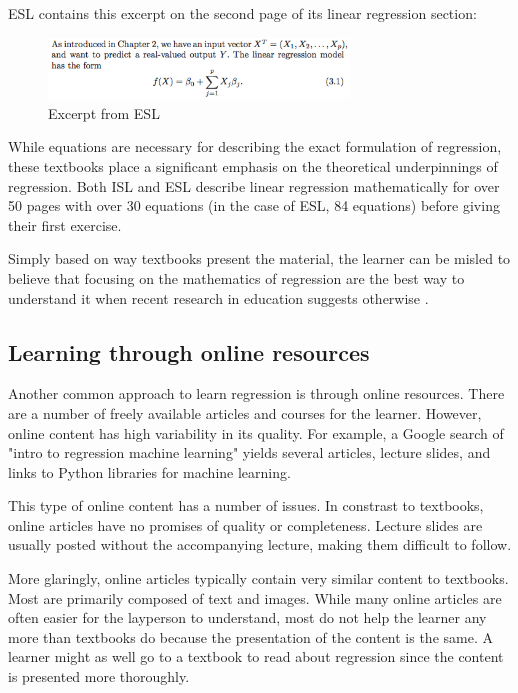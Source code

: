 \documentclass{acm_proc_article-sp}
\begin{document}
ESL contains this excerpt on the second page of its linear regression section:

\begin{figure}[h]
\caption{Excerpt from ESL}
\includegraphics[width=8cm]{images/esl.png}
\end{figure}

While equations are necessary for describing the exact formulation of
regression, these textbooks place a significant emphasis on the theoretical
underpinnings of regression. Both ISL and ESL describe linear regression
mathematically for over 50 pages with over 30 equations (in the case of ESL,
84 equations) before giving their first exercise.

Simply based on way textbooks present the material, the learner can be misled
to believe that focusing on the mathematics of regression are the best way to
understand it when recent research in education suggests otherwise
\cite{van2010example}.

\subsection{Learning through online resources}

Another common approach to learn regression is through online resources. There
are a number of freely available articles and courses for the learner. However,
online content has high variability in its quality. For example, a Google
search of "intro to regression machine learning" yields several articles,
lecture slides, and links to Python libraries for machine learning.

This type of online content has a number of issues. In constrast to textbooks,
online articles have no promises of quality or completeness. Lecture slides are
usually posted without the accompanying lecture, making them difficult to
follow.

More glaringly, online articles typically contain very similar content to
textbooks. Most are primarily composed of text and images. While many online
articles are often easier for the layperson to understand, most do not help the
learner any more than textbooks do because the presentation of the content is
the same. A learner might as well go to a textbook to read about regression
since the content is presented more thoroughly.
\end{document}
